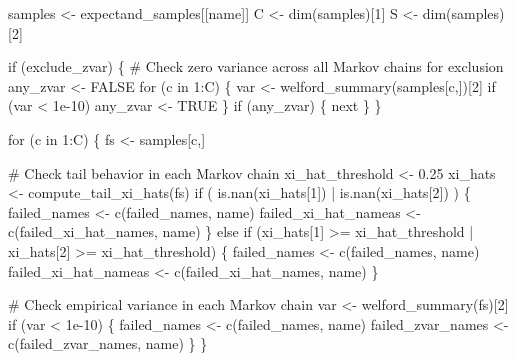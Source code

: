\documentclass[
  letterpaper,
  DIV=11,
  numbers=noendperiod]{scrartcl}
\newenvironment{Shaded}{\begin{snugshade}}{\end{snugshade}}
\newcommand{\BuiltInTok}[1]{\textcolor[rgb]{0.00,0.23,0.31}{#1}}
\newcommand{\CommentTok}[1]{\textcolor[rgb]{0.37,0.37,0.37}{#1}}
\newcommand{\ControlFlowTok}[1]{\textcolor[rgb]{0.00,0.23,0.31}{#1}}
\newcommand{\DecValTok}[1]{\textcolor[rgb]{0.68,0.00,0.00}{#1}}
\newcommand{\FloatTok}[1]{\textcolor[rgb]{0.68,0.00,0.00}{#1}}
\newcommand{\KeywordTok}[1]{\textcolor[rgb]{0.00,0.23,0.31}{#1}}
\newcommand{\NormalTok}[1]{\textcolor[rgb]{0.00,0.23,0.31}{#1}}
\newcommand{\OperatorTok}[1]{\textcolor[rgb]{0.37,0.37,0.37}{#1}}
\begin{document}
\begin{Shaded}
\begin{Highlighting}[]
\NormalTok{    samples }\OperatorTok{\textless{}{-}}\NormalTok{ expectand\_samples[[name]]}
\NormalTok{    C }\OperatorTok{\textless{}{-}}\NormalTok{ dim(samples)[}\DecValTok{1}\NormalTok{]}
\NormalTok{    S }\OperatorTok{\textless{}{-}}\NormalTok{ dim(samples)[}\DecValTok{2}\NormalTok{]}
    
    \ControlFlowTok{if}\NormalTok{ (exclude\_zvar) \{}
      \CommentTok{\# Check zero variance across all Markov chains for exclusion}
\NormalTok{      any\_zvar }\OperatorTok{\textless{}{-}}\NormalTok{ FALSE}
      \ControlFlowTok{for}\NormalTok{ (c }\KeywordTok{in} \DecValTok{1}\NormalTok{:C) \{}
\NormalTok{        var }\OperatorTok{\textless{}{-}}\NormalTok{ welford\_summary(samples[c,])[}\DecValTok{2}\NormalTok{]}
        \ControlFlowTok{if}\NormalTok{ (var }\OperatorTok{\textless{}} \FloatTok{1e{-}10}\NormalTok{)}
\NormalTok{          any\_zvar }\OperatorTok{\textless{}{-}}\NormalTok{ TRUE}
\NormalTok{      \}}
      \ControlFlowTok{if}\NormalTok{ (any\_zvar) \{}
        \BuiltInTok{next}
\NormalTok{      \}}
\NormalTok{    \}}

    \ControlFlowTok{for}\NormalTok{ (c }\KeywordTok{in} \DecValTok{1}\NormalTok{:C) \{}
\NormalTok{      fs }\OperatorTok{\textless{}{-}}\NormalTok{ samples[c,]}
      
      \CommentTok{\# Check tail behavior in each Markov chain}
\NormalTok{      xi\_hat\_threshold }\OperatorTok{\textless{}{-}} \FloatTok{0.25}
\NormalTok{      xi\_hats }\OperatorTok{\textless{}{-}}\NormalTok{ compute\_tail\_xi\_hats(fs)}
      \ControlFlowTok{if}\NormalTok{ ( }\KeywordTok{is}\NormalTok{.nan(xi\_hats[}\DecValTok{1}\NormalTok{]) }\OperatorTok{|} \KeywordTok{is}\NormalTok{.nan(xi\_hats[}\DecValTok{2}\NormalTok{]) ) \{}
\NormalTok{        failed\_names }\OperatorTok{\textless{}{-}}\NormalTok{ c(failed\_names, name)}
\NormalTok{        failed\_xi\_hat\_nameas }\OperatorTok{\textless{}{-}}\NormalTok{ c(failed\_xi\_hat\_names, name)}
\NormalTok{      \} }\ControlFlowTok{else} \ControlFlowTok{if}\NormalTok{ (xi\_hats[}\DecValTok{1}\NormalTok{] }\OperatorTok{\textgreater{}=}\NormalTok{ xi\_hat\_threshold }\OperatorTok{|} 
\NormalTok{                 xi\_hats[}\DecValTok{2}\NormalTok{] }\OperatorTok{\textgreater{}=}\NormalTok{ xi\_hat\_threshold) \{}
\NormalTok{        failed\_names }\OperatorTok{\textless{}{-}}\NormalTok{ c(failed\_names, name)}
\NormalTok{        failed\_xi\_hat\_nameas }\OperatorTok{\textless{}{-}}\NormalTok{ c(failed\_xi\_hat\_names, name)}
\NormalTok{      \}}
      
      \CommentTok{\# Check empirical variance in each Markov chain}
\NormalTok{      var }\OperatorTok{\textless{}{-}}\NormalTok{ welford\_summary(fs)[}\DecValTok{2}\NormalTok{]}
      \ControlFlowTok{if}\NormalTok{ (var }\OperatorTok{\textless{}} \FloatTok{1e{-}10}\NormalTok{) \{}
\NormalTok{        failed\_names }\OperatorTok{\textless{}{-}}\NormalTok{ c(failed\_names, name)}
\NormalTok{        failed\_zvar\_names }\OperatorTok{\textless{}{-}}\NormalTok{ c(failed\_zvar\_names, name) }
\NormalTok{      \}}
\NormalTok{    \}}


\end{Highlighting}
\end{Shaded}
\end{document}
